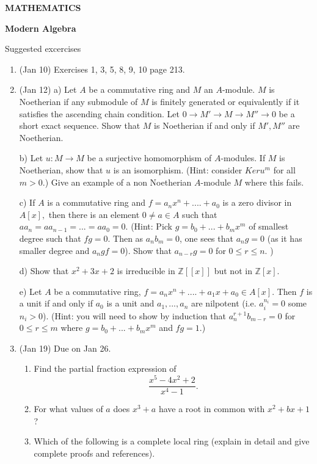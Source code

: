 \documentclass[12pt] {amsart}
\begin{document}
\bigskip\bigskip\bigskip\bigskip
\centerline{\bf MATHEMATICS }
\centerline{\bf Modern Algebra}
\centerline{Suggested excercises}
\bigskip

\begin{enumerate}
\item (Jan 10) Exercises 1, 3, 5, 8, 9, 10 page 213.
\item (Jan 12) a)
Let $A$ be a commutative ring and $M$ an $A$-module. $M$ is Noetherian if
any submodule of $M$ is finitely generated or equivalently if it satisfies 
the ascending chain condition. 
Let $0\rightarrow M'\rightarrow M\rightarrow M
''\rightarrow 0$ be a short exact sequence. Show that $M$ is Noetherian if
and only if $M',M''$ are Noetherian. %

b) Let $u:M\rightarrow M$ be a surjective homomorphism of $A$-modules.
If $M$ is Noetherian, show that $u$ is an isomorphism.
(Hint: consider $Ker u^m$ for all $m>0$.) 
Give an example of a non Noetherian $A$-module $M$ where this fails.

c) If $A$ is a commutative ring and $f=a_nx^n+....+a_0$ is a zero divisor 
in $A[x],$ then there is an element $0\ne a\in A$ such that
$aa_n=aa_{n-1}=...=aa_0=0$. (Hint: Pick $g=b_0+...+b_mx^m$ of smallest degree 
such that $fg=0$. Then as $a_nb_m=0$, one sees that $a_ng=0$ (as it has 
smaller degree and $a_ngf=0$). Show that $a_{n-r}g=0$ for $0\leq r\leq n$. )

d) Show that $x^2+3x+2$ is irreducible in $\mathbb{Z}[[x]]$ but not in
$\mathbb{Z}[x]$.

e) Let $A$ be a commutative ring, $f=a_nx^n+....+a_1x+a_0\in A[x]$.
Then $f$ is a unit if and only if $a_0$ is a unit and $a_1,...,a_n$ are 
nilpotent (i.e. $a_i^{n_i}=0$ some $n_i>0$).
(Hint: you will need to show by induction that $a_{n}^{r+1}b_{m-r}=0$
for $0\leq r\leq m$ where $g=b_0+...+b_mx^m$ and $fg=1$.) 
\item (Jan 19) Due on Jan 26.
\begin{enumerate}
\item
Find the partial fraction expression of $$\frac{x^5-4x^2+2}{x^4-1}.$$
\item For what values of $a$ does $x^3+a$ have a root in common with
$x^2+bx+1$?
\item Which of the following is a complete local ring (explain in detail
and give complete proofs and references).


\end{enumerate}
\end{enumerate}
\end{document}
